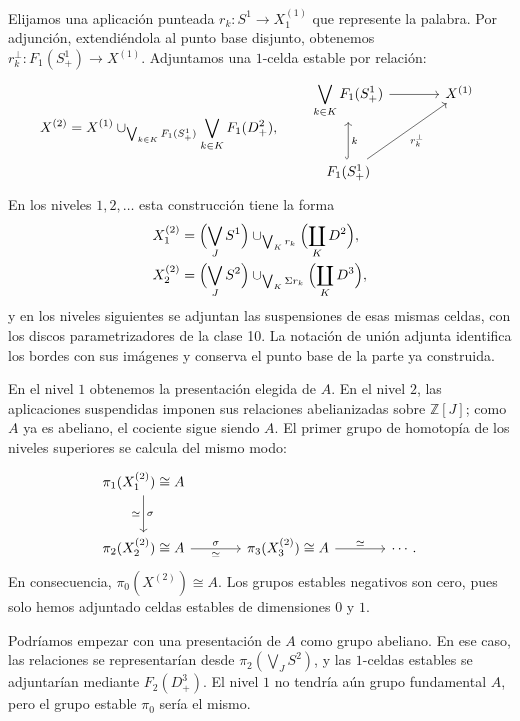 Elijamos una aplicación punteada $r_k\colon S^1\to X^{(1)}_1$ que represente la palabra. Por adjunción, extendiéndola al punto base disjunto, obtenemos $r_k^\perp\colon F_1(S^1_+)\to X^{(1)}$. Adjuntamos una $1$-celda estable por relación:
\[
X^{(2)}=X^{(1)}
\cup_{\bigvee_{k\in K}F_1(S^1_+)}
\bigvee_{k\in K}F_1(D^2_+),
\qquad
\begin{tikzcd}[column sep=large,row sep=large]
\displaystyle\bigvee_{k\in K}F_1(S^1_+)\arrow[r]&X^{(1)}\\
F_1(S^1_+)\arrow[u,hook,"k"']\arrow[ur,"r_k^\perp"']&
\end{tikzcd}
\]
En los niveles $1,2,\ldots$ esta construcción tiene la forma
\[
\begin{aligned}
X^{(2)}_1&=\Bigl(\bigvee_JS^1\Bigr)\cup_{\bigvee_Kr_k}\Bigl(\coprod_KD^2\Bigr),\\
X^{(2)}_2&=\Bigl(\bigvee_JS^2\Bigr)\cup_{\bigvee_K\Sigma r_k}\Bigl(\coprod_KD^3\Bigr),
\end{aligned}
\]
y en los niveles siguientes se adjuntan las suspensiones de esas mismas celdas, con los discos parametrizadores de la clase 10. La notación de unión adjunta identifica los bordes con sus imágenes y conserva el punto base de la parte ya construida.

En el nivel $1$ obtenemos la presentación elegida de $A$. En el nivel $2$, las aplicaciones suspendidas imponen sus relaciones abelianizadas sobre $\mathbb Z[J]$; como $A$ ya es abeliano, el cociente sigue siendo $A$. El primer grupo de homotopía de los niveles superiores se calcula del mismo modo:
\[
\begin{tikzcd}[column sep=large,row sep=large]
\pi_1(X^{(2)}_1)\cong A\arrow[d,"\sigma","\simeq"']&\\
\pi_2(X^{(2)}_2)\cong A\arrow[r,"\sigma","\simeq"']
&\pi_3(X^{(2)}_3)\cong A\arrow[r,"\simeq"]&\cdots.
\end{tikzcd}
\]
En consecuencia, $\pi_0(X^{(2)})\cong A$. Los grupos estables negativos son cero, pues solo hemos adjuntado celdas estables de dimensiones $0$ y $1$.

Podríamos empezar con una presentación de $A$ como grupo abeliano. En ese caso, las relaciones se representarían desde $\pi_2(\bigvee_JS^2)$, y las $1$-celdas estables se adjuntarían mediante $F_2(D^3_+)$. El nivel $1$ no tendría aún grupo fundamental $A$, pero el grupo estable $\pi_0$ sería el mismo.

